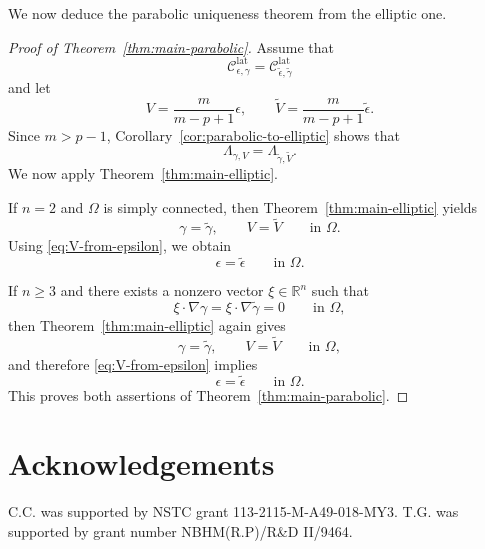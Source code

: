 \documentclass[a4paper,12pt]{article}
\newcommand{\R}{\mathbb{R}}
\theoremstyle{definition}
\theoremstyle{remark}
\newtheorem{rem}[thm]{Remark}
\begin{document}
We now deduce the parabolic uniqueness theorem from the elliptic one.

\begin{proof}[Proof of Theorem~\ref{thm:main-parabolic}]
Assume that
\[
\mathcal C^{\mathrm{lat}}_{\epsilon,\gamma}=\mathcal C^{\mathrm{lat}}_{\tilde\epsilon,\tilde\gamma}
\]
and let
\[
V=\frac{m}{m-p+1}\epsilon,
\qquad
\tilde V=\frac{m}{m-p+1}\tilde\epsilon.
\]
Since $m>p-1$, Corollary~\ref{cor:parabolic-to-elliptic} shows that
\[
\Lambda_{\gamma,V}=\Lambda_{\tilde\gamma,\tilde V}.
\]
We now apply Theorem~\ref{thm:main-elliptic}.

If $n=2$ and $\Omega$ is simply connected, then Theorem~\ref{thm:main-elliptic} yields
\[
\gamma=\tilde\gamma,
\qquad
V=\tilde V
\qquad \text{in }\Omega.
\]
Using \eqref{eq:V-from-epsilon}, we obtain
\[
\epsilon=\tilde\epsilon
\qquad \text{in }\Omega.
\]

If $n\ge 3$ and there exists a nonzero vector $\xi\in\R^n$ such that
\[
\xi\cdot\nabla\gamma=\xi\cdot\nabla\tilde\gamma=0
\qquad \text{in }\Omega,
\]
then Theorem~\ref{thm:main-elliptic} again gives
\[
\gamma=\tilde\gamma,
\qquad
V=\tilde V
\qquad \text{in }\Omega,
\]
and therefore \eqref{eq:V-from-epsilon} implies
\[
\epsilon=\tilde\epsilon
\qquad \text{in }\Omega.
\]
This proves both assertions of Theorem~\ref{thm:main-parabolic}.
\end{proof}

%

\section*{Acknowledgements}
C.C. was supported by NSTC grant  113-2115-M-A49-018-MY3. T.G. was supported by grant number NBHM(R.P)/R\&D II/9464.



\end{document}

